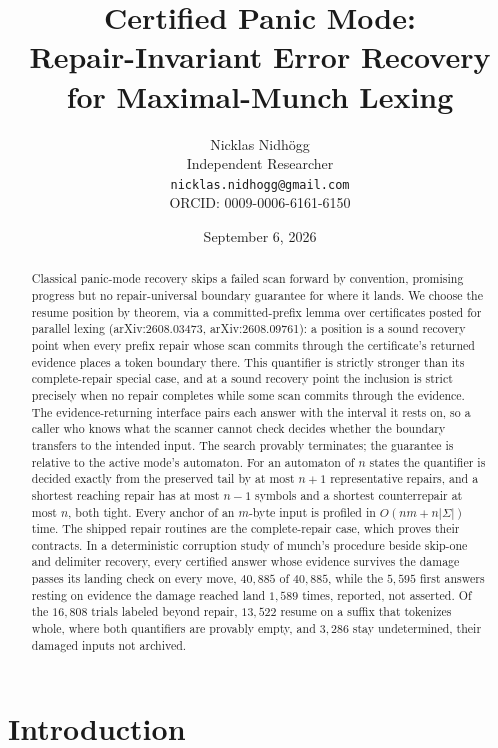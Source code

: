 \documentclass[11pt,a4paper]{article}
\title{Certified Panic Mode:\\Repair-Invariant Error Recovery for Maximal-Munch Lexing}
\author{Nicklas Nidh\"ogg\\[0.4em] \normalsize Independent Researcher\\ \normalsize
\texttt{nicklas.nidhogg@gmail.com}\\ \normalsize ORCID: 0009-0006-6161-6150}
\date{September 6, 2026}
\theoremstyle{definition}
\theoremstyle{plain}
\theoremstyle{remark}
\begin{document}
\maketitle

\begin{abstract}
Classical panic-mode recovery skips a failed scan forward by convention, promising progress but no repair-universal
boundary guarantee for where it lands. We choose the resume position by theorem, via a committed-prefix lemma over
certificates posted for parallel lexing (arXiv:2608.03473, arXiv:2608.09761): a position is a sound recovery point when
every prefix repair whose scan commits through the certificate's returned evidence places a token boundary there. This
quantifier is strictly stronger than its complete-repair special case, and at a sound recovery point the inclusion is
strict precisely when no repair completes while some scan commits through the evidence. The evidence-returning interface
pairs each answer with the interval it rests on, so a caller who knows what the scanner cannot check decides whether the
boundary transfers to the intended input. The search provably terminates; the guarantee is relative to the active mode's
automaton. For an automaton of $n$ states the quantifier is decided exactly from the preserved tail by at most $n + 1$
representative repairs, and a shortest reaching repair has at most $n - 1$ symbols and a shortest counterrepair at most
$n$, both tight. Every anchor of an $m$-byte input is profiled in $O(nm + n|\Sigma|)$ time. The shipped repair routines
are the complete-repair case, which proves their contracts. In a deterministic corruption study of munch's procedure
beside skip-one and delimiter recovery, every certified answer whose evidence survives the damage passes its landing
check on every move, $40{,}885$ of $40{,}885$, while the $5{,}595$ first answers resting on evidence the damage reached
land $1{,}589$ times, reported, not asserted. Of the $16{,}808$ trials labeled beyond repair, $13{,}522$ resume on a
suffix that tokenizes whole, where both quantifiers are provably empty, and $3{,}286$ stay undetermined, their damaged
inputs not archived.
\end{abstract}

\section{Introduction}
\end{document}
